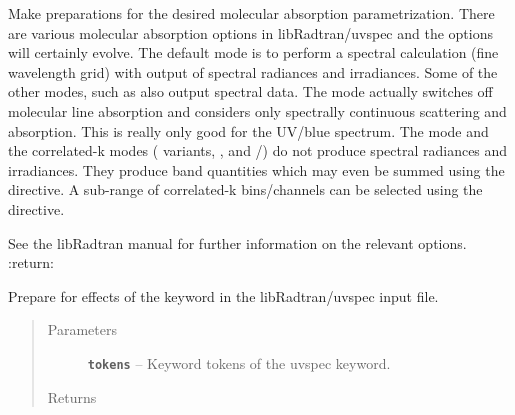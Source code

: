 \documentclass[a4paper,10pt,english]{sphinxmanual}
\begin{document}
\begin{fulllineitems}
\begin{fulllineitems}
\label{packages:librad.Case.prepare_for_mol_abs_param}
Make preparations for the desired molecular absorption parametrization. There are various
molecular absorption options in libRadtran/uvspec and the options will certainly evolve.
The default mode is to perform a spectral calculation (fine wavelength grid) with output
of spectral radiances and irradiances. Some of the other modes, such as  also output
spectral data. The  mode actually switches off molecular line absorption and considers
only spectrally continuous scattering and absorption. This is really only good for the UV/blue
spectrum. The  mode and the correlated-k modes ( variants, , 
and /) do not produce spectral radiances and irradiances. They produce band quantities
which may even be summed using the  directive. A sub-range of correlated-k
bins/channels can be selected using the  directive.

See the libRadtran manual for further information on the relevant options.
:return:

\end{fulllineitems}


\begin{fulllineitems}
\label{packages:librad.Case.prepare_for_output_process}
Prepare for effects of the  keyword in the libRadtran/uvspec input file.
\begin{quote}\begin{description}
\item[{Parameters}] \leavevmode
\textbf{\texttt{tokens}} -- Keyword tokens of the uvspec  keyword.

\item[{Returns}] \leavevmode


\end{description}\end{quote}

\end{fulllineitems}



\end{fulllineitems}
\end{document}
